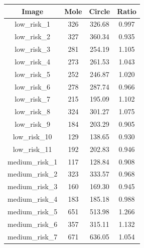 \documentclass[a4paper,12pt,oneside,titlepage]{article}
\begin{document}
	
	\begin{table}[H]\footnotesize
		\begin{minipage}[b]{0.5\linewidth}%
			\begin{tabular}{|c|c|c|c|}
				\hline
				\textbf{Image}  & \textbf{Mole} & \textbf{Circle} & \textbf{Ratio} \\
				\hline
				low\_risk\_1                          &326                     &326.68         &0.997\\
				low\_risk\_2                          &327                     &360.34         &0.935\\
				low\_risk\_3                          &281                     &254.19         &1.105\\
				low\_risk\_4                          &273                     &261.53         &1.043\\
				low\_risk\_5                          &252                     &246.87         &1.020\\
				low\_risk\_6                          &278                     &287.74        &0.966\\
				low\_risk\_7                          &215                     &195.09         &1.102\\
				low\_risk\_8                          &324                     &301.27       &1.075\\
				low\_risk\_9                          &184                     &203.29         &0.905\\
				low\_risk\_10                         &129                     &138.65         &0.930\\
				low\_risk\_11                         &192                     &202.83          &0.946\\
				medium\_risk\_1                       &117            &128.84      &0.908\\
				medium\_risk\_2                       &323            &333.57      &0.968\\
				medium\_risk\_3                       &160            &169.30      &0.945\\
				medium\_risk\_4                       &183            &185.18      &0.988\\
				medium\_risk\_5                       &651            &513.98      &1.266\\
				medium\_risk\_6                       &357            &315.11      &1.132\\
				medium\_risk\_7                       &671            &636.05      &1.054\\

\end{tabular}
\end{minipage}
\end{table}
\end{document}
